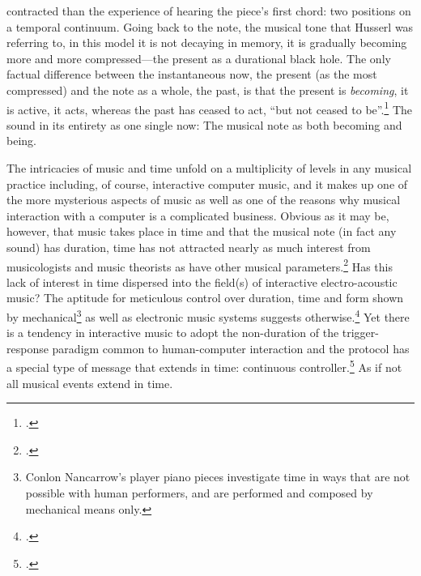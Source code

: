 contracted than the experience of hearing the piece's first chord: two positions on a temporal continuum. Going back to the note, the musical tone that Husserl was referring to, in this model it is not decaying in memory, it is gradually becoming more and more compressed---the present as a durational black hole. The only factual difference  between the instantaneous now, the present (as the most compressed) and the note as a whole, the past, is that the present is \emph{becoming}, it is active, it acts, whereas the past has ceased to act, ``but not ceased to be''.\footcite[55]{deleuze88} The sound in its entirety as one single now: The musical note as both becoming and being.



The intricacies of music and time unfold on a multiplicity of levels in any musical practice including, of course, interactive computer music, and it makes up one of the more mysterious aspects of music as well as one of the reasons why musical interaction with a computer is a complicated business. Obvious as it may be, however, that music takes place in time and that the musical note (in fact any sound) has duration, time has not attracted nearly as much interest from musicologists and music theorists as have other musical parameters.\footcite[2]{kramer88} Has this lack of interest in time dispersed into the field(s) of interactive electro-acoustic music? The aptitude for meticulous control over duration, time and form shown by mechanical\footnote{Conlon Nancarrow's player piano pieces investigate time in ways that are not possible with human performers, and are performed and composed by mechanical means only.} as well as electronic music systems suggests otherwise.\footcite[For an example that discusses many different timescales (chap. 1), but with a focus on micro-time, see][]{roads} Yet there is a tendency in interactive music to adopt the non-duration of the trigger-response paradigm common to human-computer interaction and the  protocol has a special type of message that extends in time: continuous controller.\footcites(For a more detailed discussion on the problems of MIDI, see)()[][]{moore88}[ and][]{puckette94} As if not all musical events extend in time. 

